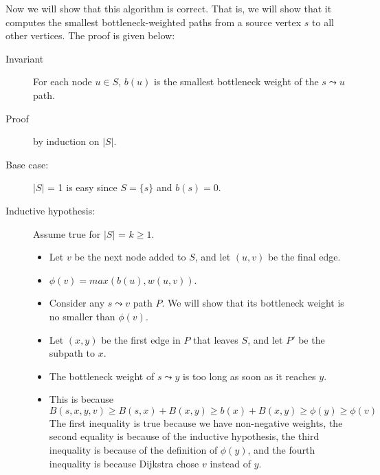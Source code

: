 \documentclass{article}
\begin{document}
Now we will show that this algorithm is correct. That is, we will show that it
computes the smallest bottleneck-weighted paths from a source vertex $s$ to all
other vertices. The proof is given below:
\begin{description}
    \item[Invariant] For each node $u \in S$, $b(u)$ is the smallest bottleneck
        weight of the $s \leadsto u$ path.
    \item[Proof] by induction on $|S|$.
    \item[Base case:] $|S|$ = 1 is easy since $S = \{s\}$ and $b(s) = 0$.
    \item[Inductive hypothesis:] Assume true for $|S|$ = $k \ge 1$.
        \begin{itemize}
            \item Let $v$ be the next node added to $S$, and let $(u,v)$ be the
                final edge.
            \item $\phi(v) = max(b(u), w(u,v))$.
            \item Consider any $s \leadsto v$ path $P$. We will show that
                its bottleneck weight is no smaller than $\phi(v)$.
            \item Let $(x,y)$ be the first edge in $P$ that leaves $S$, and
                let $P'$ be the subpath to $x$.
            \item The bottleneck weight of $s \leadsto y$ is too long as soon as
                it reaches $y$.
            \item This is because
                \[ B(s,x,y,v) \ge B(s,x) + B(x,y) \ge b(x) + B(x,y) \ge \phi(y)
                    \ge \phi(v) \]
                The first inequality is true because we have non-negative
                weights, the second equality is because of the inductive
                hypothesis, the third inequality is because of the definition of
                $\phi(y)$, and the fourth inequality is because Dijkstra chose
                $v$ instead of $y$.

        \end{itemize}
\end{description}


\newpage
\end{document}
